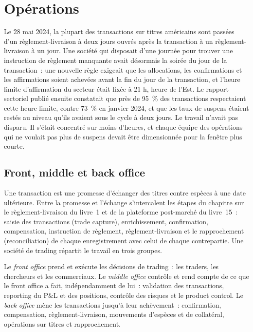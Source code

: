  \chapter{Opérations}\label{ch:fm:operations}

Le 28 mai 2024, la plupart des transactions sur titres américains sont passées d'un règlement-livraison à deux jours ouvrés après la transaction à un règlement-livraison à un jour. Une société qui disposait d'une journée pour trouver une
instruction de règlement manquante avait désormais la soirée du jour de la transaction~: une nouvelle règle exigeait que les allocations, les confirmations et les affirmations soient
achevées avant la fin du jour de la transaction, et l'heure limite d'affirmation du secteur était fixée à 21 h, heure de l'Est. Le rapport sectoriel publié ensuite constatait
que près de 95~\% des transactions respectaient cette heure limite, contre 73~\% en janvier 2024, et que les taux de suspens étaient restés au niveau qu'ils avaient sous le
cycle à deux jours. Le travail n'avait pas disparu. Il s'était concentré sur moins d'heures, et chaque équipe des opérations qui ne voulait pas plus de suspens devait être dimensionnée pour la
fenêtre plus courte.

\section{Front, middle et back office}

Une transaction est une promesse d'échanger des titres contre espèces à une date ultérieure. Entre la promesse et l'échange s'intercalent les étapes du chapitre sur le règlement-livraison
du livre~1 et de la plateforme post-marché du livre~15~: saisie des transactions (trade capture), enrichissement, confirmation, compensation, instruction de règlement, règlement-livraison et le
rapprochement (reconciliation) de chaque enregistrement avec celui de chaque contrepartie. Une société de trading répartit le travail en trois groupes.

\begin{definition}\label{def:fm:operations:offices}
Le \emph{front office} prend et exécute les décisions de trading~: les traders, les chercheurs et les commerciaux. Le \emph{middle
office} contrôle et rend compte de ce que le front office a fait, indépendamment de lui~: validation des transactions, reporting du P\&L et des
positions, contrôle des risques et le product control. Le \emph{back office} mène les transactions jusqu'à leur achèvement~: confirmation,
compensation, règlement-livraison, mouvements d'espèces et de collatéral, opérations sur titres et rapprochement.
\end{definition}

